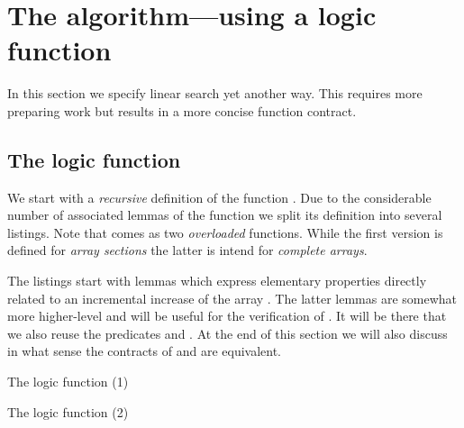 
\section{The \findiii algorithm---using a logic function}

In this section we specify linear search yet another way.
This requires more preparing work but results in a more concise function contract.

\subsection{The logic function \Find}

We start with a \emph{recursive} definition of the \acsl function \Find.
Due to the considerable number of associated lemmas of the function
\Find we split its definition into several listings.
Note that \Find comes as two \emph{overloaded} functions.
While the first version is defined for \emph{array sections} the latter is intend
for \emph{complete arrays}.

The listings start with lemmas which express elementary
properties directly related to an incremental increase of the array . 
The latter lemmas are somewhat more higher-level and will
be useful for the verification of \findiii.
It will be there that we also reuse the predicates 
and
.
%
At the end of this section we will also discuss in what sense the contracts
of \findii and \findiii are equivalent.

\begin{logic}[hbt]
\begin{minipage}{0.99\textwidth}

\end{minipage}
\caption{The logic function \Find (1)}


\end{logic}

\FloatBarrier

\begin{logic}[hbt]
\begin{minipage}{0.99\textwidth}

\end{minipage}
\caption{The logic function \Find (2)}
\end{logic}

\FloatBarrier


